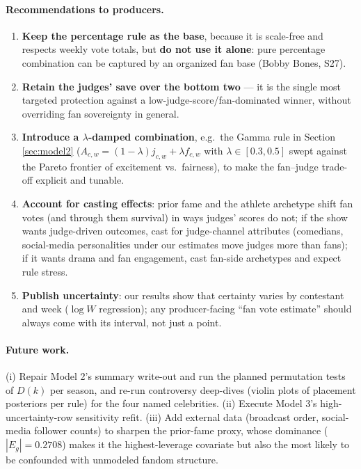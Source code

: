 \paragraph{Recommendations to producers.}
\begin{enumerate}
\item \textbf{Keep the percentage rule as the base}, because it is scale-free and
respects weekly vote totals, but \textbf{do not use it alone}: pure percentage
combination can be captured by an organized fan base (Bobby Bones, S27).
\item \textbf{Retain the judges' save over the bottom two} --- it is the single
most targeted protection against a low-judge-score/fan-dominated winner, without
overriding fan sovereignty in general.
\item \textbf{Introduce a $\lambda$-damped combination}, e.g.\ the Gamma rule in
Section \ref{sec:model2} ($A_{c,w} = (1-\lambda)j_{c,w} + \lambda f_{c,w}$ with
$\lambda \in [0.3, 0.5]$ swept against the Pareto frontier of excitement vs.\
fairness), to make the fan--judge trade-off explicit and tunable.
\item \textbf{Account for casting effects}: prior fame and the athlete archetype
shift fan votes (and through them survival) in ways judges' scores do not;
if the show wants judge-driven outcomes, cast for judge-channel attributes
(comedians, social-media personalities under our estimates move judges more than
fans); if it wants drama and fan engagement, cast fan-side archetypes and expect
rule stress.
\item \textbf{Publish uncertainty}: our results show that certainty varies by
contestant and week ($\log W$ regression); any producer-facing ``fan vote
estimate'' should always come with its interval, not just a point.
\end{enumerate}

\paragraph{Future work.} (i) Repair Model 2's summary write-out and run the
planned permutation tests of $D(k)$ per season, and re-run controversy
deep-dives (violin plots of placement posteriors per rule) for the four named
celebrities. (ii) Execute Model 3's high-uncertainty-row sensitivity refit.
(iii) Add external data (broadcast order, social-media follower counts) to
sharpen the prior-fame proxy, whose dominance ($|E_g| = 0.2708$) makes it the
highest-leverage covariate but also the most likely to be confounded with
unmodeled fandom structure.

